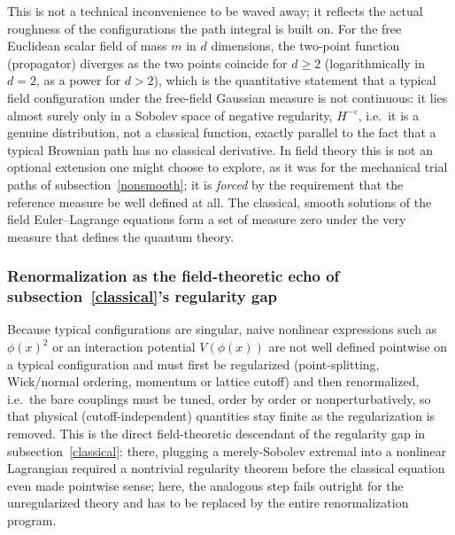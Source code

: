 This is not a technical inconvenience to be waved away; it reflects the actual
roughness of the configurations the path integral is built on. For the free
Euclidean scalar field of mass $m$ in $d$ dimensions, the two-point function
(propagator) diverges as the two points coincide for $d\ge 2$ (logarithmically
in $d=2$, as a power for $d>2$), which is the quantitative statement that a
typical field configuration under the free-field Gaussian measure is not
continuous: it lies almost surely only in a Sobolev space of negative
regularity, $H^{-\varepsilon}$, i.e.\ it is a genuine distribution, not a
classical function, exactly parallel to the fact that a typical Brownian path
has no classical derivative. In field theory this is not an optional extension
one might choose to explore, as it was for the mechanical trial paths of
subsection~\ref{nonsmooth}; it is \emph{forced} by the requirement that the
reference measure be well defined at all. The classical, smooth solutions of
the field Euler--Lagrange equations form a set of measure zero under the very
measure that defines the quantum theory.

\subsubsection{Renormalization as the field-theoretic echo of
subsection~\ref{classical}'s regularity gap}

Because typical configurations are singular, naive nonlinear expressions such
as $\phi(x)^2$ or an interaction potential $V(\phi(x))$ are not well defined
pointwise on a typical configuration and must first be regularized
(point-splitting, Wick/normal ordering, momentum or lattice cutoff) and then
renormalized, i.e.\ the bare couplings must be tuned, order by order or
nonperturbatively, so that physical (cutoff-independent) quantities stay finite
as the regularization is removed. This is the direct field-theoretic descendant
of the regularity gap in subsection~\ref{classical}: there, plugging a
merely-Sobolev extremal into a nonlinear Lagrangian required a nontrivial
regularity theorem before the classical equation even made pointwise sense;
here, the analogous step fails outright for the unregularized theory and has to
be replaced by the entire renormalization program.

